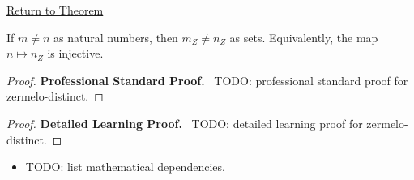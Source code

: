 \newpage
{}
\label{prf:zermelo-distinct}

\begin{remark*}[Return]
\hyperref[prop:zermelo-distinct]{Return to Theorem}
\end{remark*}

\begin{theorem*}
If $m\neq n$ as natural numbers, then $m_Z \neq n_Z$ as sets.
Equivalently, the map $n\mapsto n_Z$ is injective.
\end{theorem*}

\begin{proof}
\textbf{Professional Standard Proof.}~
TODO: professional standard proof for zermelo-distinct.
\end{proof}

\begin{proof}
\textbf{Detailed Learning Proof.}~
TODO: detailed learning proof for zermelo-distinct.
\end{proof}

\begin{remark*}
\end{remark*}

\begin{dependencies}
\begin{itemize}
  \item TODO: list mathematical dependencies.
\end{itemize}
\end{dependencies}

\clearpage
